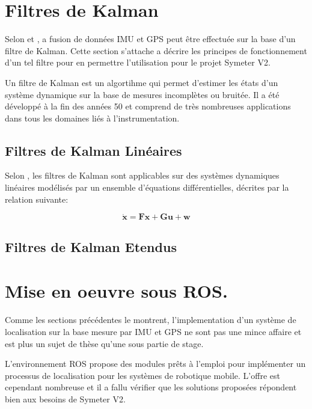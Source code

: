 \documentclass[12pt,a4paper]{report}
\begin{document}
	
	\section{Filtres de Kalman}
	
	Selon \cite{gustavsson_uav_2015} et \cite{menegatti_generalized_2016}, a fusion de données IMU et GPS peut être effectuée sur la base d'un filtre de Kalman. Cette section s'attache a décrire les principes de fonctionnement d'un tel filtre pour en permettre l'utilisation pour le projet Symeter V2.
	
	Un filtre de Kalman est un algortihme qui permet d'estimer les états d'un système dynamique sur la base  de mesures incomplètes ou bruitée. Il a été développé à la fin des années 50 et comprend de très nombreuses applications dans tous les domaines liés à l'instrumentation.
	
	\subsection{Filtres de Kalman Linéaires}
	Selon \cite{zarchan_fundamentals_2009}, les filtres de Kalman sont applicables sur des systèmes dynamiques linéaires modélisés par un ensemble d'équations différentielles, décrites par la relation suivante:
	
	\begin{equation}
	\boldsymbol{
		\dot{x} = Fx + Gu + w
	}
	\end{equation}
	
	\subsection{Filtres de Kalman Etendus}
	
	\section{Mise en oeuvre sous ROS.} Comme les sections précédentes le montrent, l'implementation d'un système de localisation sur la base mesure par IMU et GPS ne sont pas une mince affaire et est plus un sujet de thèse qu'une sous partie de stage. 
	
	\para L'environnement ROS propose des modules prêts à l'emploi pour implémenter un processus de localisation pour les systèmes de robotique mobile. L'offre est cependant nombreuse et il a fallu vérifier que les solutions proposées répondent bien aux besoins de Symeter V2.
	
\end{document}
